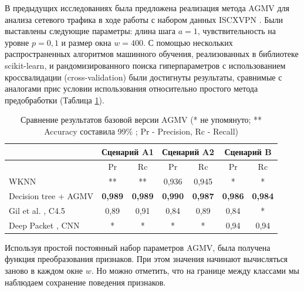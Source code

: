 В предыдущих исследованиях \cite{Ivch_2021} была предложена реализация метода AGMV для анализа сетевого трафика в ходе работы с набором данных ISCXVPN \cite{icissp16}. Были выставлены следующие параметры: длина шага $a=1$, чувствительность на уровне $p=0,1$ и  размер окна $w=400$. С помощью  нескольких распространенных алгоритмов машинного обучения, реализованных в библиотеке scikit-learn, и рандомизированного поиска гиперпараметров с использованием кроссвалидации (cross-validation) были достигнуты результаты, сравнимые с аналогами прис условии использования относительно простого метода предобработки (Таблица \ref{tab:sota_agmv}).


\begin{table}[h] 
	\centering
	\caption{ Сравнение результатов базовой версии AGMV  (* не упомянуто; ** Accuracy составила 99\% ; Pr - Precision, Rc - Recall)}
	\begin{tabular}{|>{\centering\arraybackslash}p{5.4cm}|c|c|c|c|c|c|}
		\hline
		\multirow{2}{*}{\textbf{Метод}} & \multicolumn{2}{c|}{\textbf{Сценарий A1}} & \multicolumn{2}{c|}{\textbf{Сценарий A2}} & \multicolumn{2}{c|}{\textbf{Сценарий B}} \\
		\cline{2-7}
		&    Pr     &     Rc   &    Pr     &    Rc    &    Pr     &    Rc    \\
		\hline
		WKNN \cite{Ma2020}   &   **      &   **     &   0,936   &   0,945  &    *      &   *      \\
		\hline
		Decision tree + AGMV \cite{Ivch_2021}  &\textbf{0,989} & \textbf{0,989} & \textbf{0,990}&\textbf{0,987}&\textbf{0,986 } & \textbf{0,984}\\
		\hline
		Gil et al. \cite{icissp16}, C4.5  &  0,89   &   0,91    &  0,84    &  0,89    &  0,84     &    *     \\
		\hline
		Deep Packet \cite{Lotfollahi2019}, CNN &   *       &     * &     *  &    *  &    0,94       &    0,94  \\
		\hline
	\end{tabular}
	\label{tab:sota_agmv}
\end{table}



Используя простой постоянный набор параметров AGMV, была получена функция преобразования признаков. При этом значения начинают вычисляться заново в каждом окне $w$. Но можно отметить, что на границе между классами мы наблюдаем сохранение поведения признаков.


